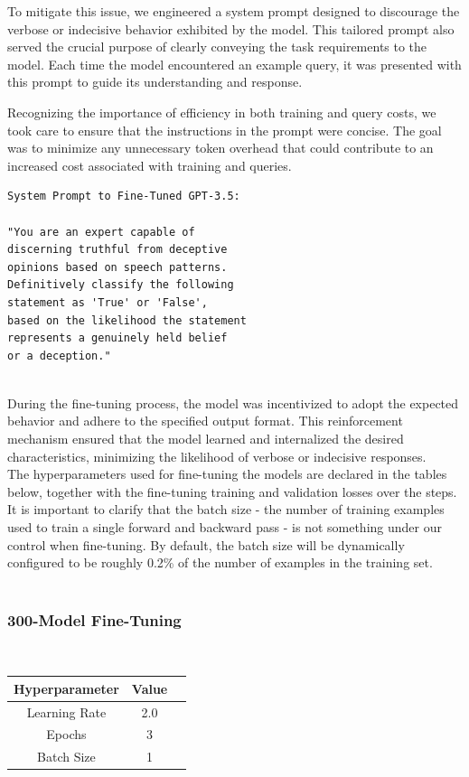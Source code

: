 \documentclass[10pt,twocolumn,letterpaper]{article}
\begin{document}
To mitigate this issue, we engineered a system prompt designed to 
discourage the verbose or indecisive behavior exhibited by the model. This tailored prompt also served
the crucial purpose of clearly conveying the task requirements to the model. Each time the model encountered 
an example query, it was presented with this prompt to guide its understanding and response.

Recognizing the importance of efficiency in both training and query costs, we took care to ensure that 
the instructions in the prompt were concise. The goal was to minimize any unnecessary token overhead that 
could contribute to an increased cost associated with training and queries.  \\

\begin{verbatim}
System Prompt to Fine-Tuned GPT-3.5:

"You are an expert capable of
discerning truthful from deceptive
opinions based on speech patterns. 
Definitively classify the following 
statement as 'True' or 'False', 
based on the likelihood the statement
represents a genuinely held belief 
or a deception."
\end{verbatim} \\

During the fine-tuning process, the model was incentivized to adopt the expected behavior and adhere to the specified output format. 
This reinforcement mechanism ensured that the model learned and internalized the desired characteristics, 
minimizing the likelihood of verbose or indecisive responses. \\

The hyperparameters used for fine-tuning the models are declared in 
the tables below, together with the fine-tuning training and validation losses over the steps.
It is important to clarify that the batch size - the number of training examples used to train a single forward and backward pass - is not something under our control when fine-tuning.
By default, the batch size will be dynamically configured to be roughly 0.2\% of the number of examples in the training set. \\

\

\subsubsection*{300-Model Fine-Tuning} \\

\begin{center}

    \begin{tabular}{ccc}
        \toprule
        Hyperparameter & Value \\
        \midrule
        Learning Rate & 2.0 \\
        Epochs & 3 \\
        Batch Size & 1 \\
        \bottomrule
    \end{tabular}
\end{center} 
\end{document}
